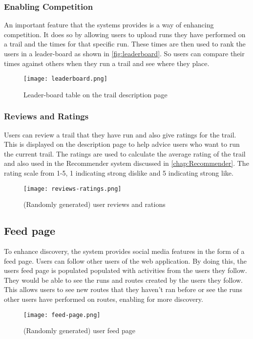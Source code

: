 \subsubsection{Enabling Competition}
An important feature that the systems provides is a way of enhancing competition. It does so by allowing users to upload runs they have performed on a trail and the times for that specific run. These times are then used to rank the users in a leader-board as shown in \autoref{fig:leaderboard}. So users can compare their times against others when they run a trail and see where they place. 

\begin{figure}[htb!]
    \centering
    \texttt{[image: leaderboard.png]}
    \caption{Leader-board table on the trail description page}
    \label{fig:leaderboard}
\end{figure}

\subsubsection{Reviews and Ratings}
Users can review a trail that they have run and also give ratings for the trail. This is displayed on the description page to help advice users who want to run the current trail. The ratings are used to calculate the average rating of the trail and also used in the Recommender system discussed in \autoref{chap:Recommender}. The rating scale \cite{wright1982rating} from 1-5, 1 indicating strong dislike and 5 indicating strong like.

\begin{figure}[htb!]
    \centering
    \texttt{[image: reviews-ratings.png]}
    \caption{(Randomly generated) user reviews and rations}
    \label{fig:reviews}
\end{figure}

\subsection{Feed page}
To enhance discovery, the system provides social media features in the form of a feed page. Users can follow other users of the web application. By doing this, the users feed page is populated populated with activities from the users they follow. They would be able to see the runs and routes created by the users they follow. This allows users to see new routes that they haven't ran before or see the runs other users have performed on routes, enabling for more discovery.

\begin{figure}[htb!]
    \centering
    \texttt{[image: feed-page.png]}
    \caption{(Randomly generated) user feed page}
    \label{fig:feedPage}
\end{figure}




